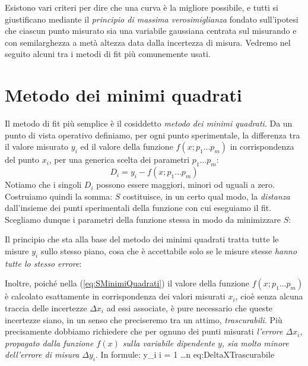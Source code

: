 Esistono vari criteri per dire che una curva \`e la migliore
possibile, e tutti si giustificano mediante il {\em principio di
massima verosimiglianza} \cite{Taylor, Loreti} fondato sull'ipotesi che ciascun
punto misurato sia una variabile gaussiana centrata sul
misurando e con semilarghezza a met\`a altezza data dalla incertezza
di misura.
Vedremo nel seguito alcuni tra i metodi di fit pi\`u comunemente usati.


\section{Metodo dei minimi quadrati}

 Il metodo di fit pi\`u semplice \`e il
cosiddetto {\itshape metodo dei minimi quadrati}.
Da un punto di vista operativo definiamo, per ogni
punto sperimentale, la differenza tra il valore misurato $y_i$ ed il valore
della funzione $f(x; p_1 \ldots p_m)$ in corrispondenza del punto $x_i$,
per una generica scelta dei parametri $p_1 \ldots p_m$:
$$
D_i = y_i - f(x; p_1 \ldots p_m)
$$
Notiamo che i singoli $D_i$ possono essere maggiori, minori od uguali a zero.
Costruiamo quindi la somma:
$S$ costituisce, in un certo qual modo, la {\itshape distanza} dall'insieme
dei punti sperimentali della funzione con cui eseguiamo il fit.
Scegliamo dunque i parametri della funzione stessa in modo da minimizzare
$S$:

Il principio che sta alla base del metodo dei minimi quadrati tratta tutte
le misure $y_i$ sullo stesso piano, cosa che \`e accettabile solo se le misure
stesse {\em hanno tutte lo stesso errore}:

Inoltre, poich\'e nella (\ref{eq:SMinimiQuadrati}) il valore
della funzione $f(x; p_1 \ldots p_m)$ \`e calcolato esattamente in
corrispondenza dei valori misurati $x_i$, cio\`e senza alcuna traccia delle
incertezze $\Delta x_i$ ad essi associate, \`e pure necessario che queste
incertezze siano, in un senso che preciseremo tra un attimo,
{\itshape trascurabili}.
Pi\`u precisamente dobbiamo richiedere che per ognuno dei punti misurati
\emph{l'errore $\Delta x_i$, propagato dalla funzione $f(x)$ sulla variabile
dipendente $y$, sia molto minore dell'errore di misura $\Delta y_i$}.
In formule:
\eqnlbox
{ \ll \Delta y_i
\qquad \forall i = 1 \ldots n}
{eq:DeltaXTrascurabile}

